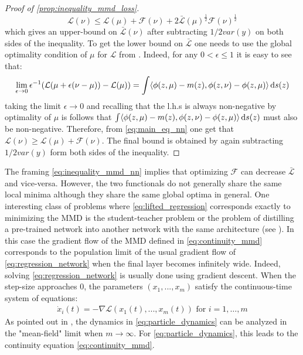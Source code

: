 \begin{proof}[Proof of \cref{prop:inequality_mmd_loss}]
\[
 \mathcal{L}(\nu)\leq \mathcal{L}(\mu)+ \mathcal{F}(\nu) + 2 \bar{\mathcal{L}}(\mu)^{\frac12}\mathcal{F(\nu)}^{\frac12}
\]
which gives an upper-bound on $\bar{\mathcal{L}}(\nu)$ after subtracting $1/2 var(y)$ on both sides of the inequality.
To get the lower bound on $\bar{\mathcal{L}}$ one needs to use the global optimality condition of $\mu$ for $\mathcal{L}$ from \cite[Porposition 3.1]{chizat2018global}. Indeed, for any $0<\epsilon\leq 1$ it is easy to see that:
\[
\lim_{\epsilon \rightarrow 0} \epsilon^{-1}( \mathcal{L}(\mu +\epsilon(\nu-\mu))-\mathcal{L}(\mu)) = \int \langle \phi(z,\mu)-m(z),\phi(z,\nu)-\phi(z,\mu) \rangle\mathop{}\!\mathrm{d} s(z)
\]
taking the limit $\epsilon\rightarrow 0$ and recalling that the l.h.s is always non-negative by optimality of $\mu$ is follows that $\int \langle \phi(z,\mu)-m(z),\phi(z,\nu)-\phi(z,\mu) \rangle\mathop{}\!\mathrm{d} s(z)$ must also be non-negative. Therefore, from \cref{eq:main_eq_nn} one get that $\mathcal{L}(\nu) \geq  \mathcal{L}(\mu)+ \mathcal{F}(\nu)$. The final bound is obtained by again subtracting $1/2 var(y)$ form both sides of the inequality.
\end{proof}
The framing \cref{eq:inequality_mmd_nn} implies that optimizing $\mathcal{F}$ can decrease  $\bar{\mathcal{L}}$ and vice-versa. However, the two functionals do not generally share the same local minima although they share the same global optima in general. One interesting class of problems where \cref{eq:lifted_regression} corresponds exactly to minimizing the MMD is the student-teacher problem or the problem of distilling a pre-trained network into another network with the same architecture (see \cite{rotskoff2019global}). In this case the gradient flow of the MMD defined in \cref{eq:continuity_mmd} corresponds to the population limit of the usual gradient flow of \cref{eq:regression_network} when the final layer becomes infinitely wide. Indeed, solving \cref{eq:regression_network} is usually done using gradient descent. When the step-size approaches $0$, the parameters $(x_1,...,x_m)$ satisfy the continuous-time system of equations:
\begin{align}\label{eq:particle_dynamics}
\dot{x}_i(t)= -\nabla \mathcal{L}(x_1(t),...,x_m(t)) \text{ for } i=1, \dots, m
\end{align}  
As pointed out in \cite{chizat2018global,rotskoff2018neural}, the dynamics in \cref{eq:particle_dynamics} can be analyzed in the "mean-field" limit when $m\rightarrow \infty$. For \cref{eq:particle_dynamics}, this leads to the continuity equation \cref{eq:continuity_mmd}. %


